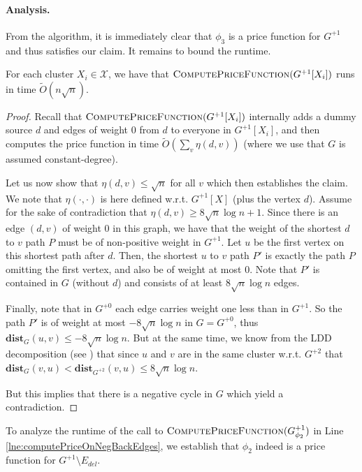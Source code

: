 \paragraph{Analysis.} From the algorithm, it is immediately clear that $\phi_3$ is a price function for $G^{+1}$ and thus satisfies our claim. It remains to bound the runtime.

\begin{claim}
For each cluster $X_i \in \mathcal{X}$, we have that $\textsc{ComputePriceFunction}(G^{+1}[X_i])$ runs in time $\tilde{O}(n \sqrt{n})$. 
\end{claim}
\begin{proof}
Recall that  $\textsc{ComputePriceFunction}(G^{+1}[X_i])$ internally adds a dummy source $d$ and edges of weight $0$ from $d$ to everyone in $G^{+1}[X_i]$, and then computes the price function in time $\tilde{O}(\sum_v \eta(d,v))$ (where we use that $G$ is assumed constant-degree).

Let us now show that $\eta(d,v) \leq \sqrt{n}$ for all $v$ which then establishes the claim. We note that $\eta(\cdot, \cdot)$ is here defined w.r.t. $G^{+1}[X]$ (plus the vertex $d$). Assume for the sake of contradiction that $\eta(d,v) \geq 8\sqrt{n} \log n + 1$. Since there is an edge $(d,v)$ of weight $0$ in this graph, we have that the weight of the shortest $d$ to $v$ path $P$ must be of non-positive weight in $G^{+1}$. Let $u$ be the first vertex on this shortest path after $d$. Then, the shortest $u$ to $v$ path $P'$ is exactly the path $P$ omitting the first vertex, and also be of weight at most $0$. Note that $P'$ is contained in $G$ (without $d$) and consists of at least $8\sqrt{n} \log n$ edges. 

Finally, note that in $G^{+0}$ each edge carries weight one less than in $G^{+1}$. So the path $P'$ is of weight at most $-8\sqrt{n} \log n$ in $G = G^{+0}$, thus $\mathbf{dist}_G(u,v) \leq -8\sqrt{n} \log n$. But at the same time, we know from the LDD decomposition (see ) that since $u$ and $v$ are in the same cluster w.r.t. $G^{+2}$ that $\mathbf{dist}_{G}(v,u) < \mathbf{dist}_{G^{+2}}(v,u) \leq 8 \sqrt{n} \log n$. 

But this implies that there is a negative cycle in $G$ which yield a contradiction.
\end{proof}

To analyze the runtime of the call to $ \textsc{ComputePriceFunction}(G^{+1}_{\phi_2})$ in Line \ref{lne:computePriceOnNegBackEdges}, we establish that $\phi_2$ indeed is a price function for $G^{+1} \setminus E_{del}$. 

